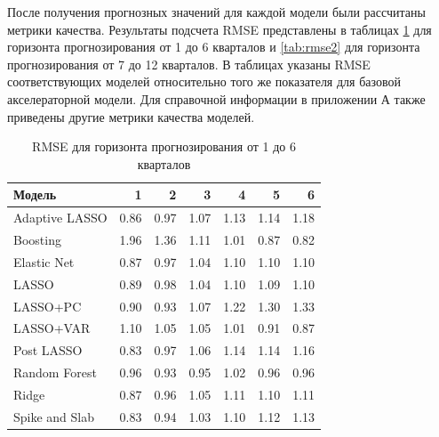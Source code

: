 После получения прогнозных значений для каждой модели были рассчитаны метрики качества. Результаты подсчета RMSE представлены в таблицах \ref{tab:rmse1} для горизонта прогнозирования от 1 до 6 кварталов и \ref{tab:rmse2} для горизонта прогнозирования от 7 до 12 кварталов. В таблицах указаны RMSE соответствующих моделей относительно того же показателя для базовой акселераторной модели. Для справочной информации в приложении А также приведены другие метрики качества моделей. 



\begin{table}[ht]
\centering
\caption{RMSE для горизонта прогнозирования от 1 до 6 кварталов}
\label{tab:rmse1}
\begin{tabular}{lrrrrrr}
  \hline
Модель & 1 & 2 & 3 & 4 & 5 & 6 \\ 
  \hline
Adaptive LASSO & 0.86 & 0.97 & 1.07 & 1.13 & 1.14 & 1.18 \\ 
  Boosting & 1.96 & 1.36 & 1.11 & 1.01 & 0.87 & 0.82 \\ 
  Elastic Net & 0.87 & 0.97 & 1.04 & 1.10 & 1.10 & 1.10 \\ 
  LASSO & 0.89 & 0.98 & 1.04 & 1.10 & 1.09 & 1.10 \\ 
  LASSO+PC & 0.90 & 0.93 & 1.07 & 1.22 & 1.30 & 1.33 \\ 
  LASSO+VAR & 1.10 & 1.05 & 1.05 & 1.01 & 0.91 & 0.87 \\ 
  Post LASSO & 0.83 & 0.97 & 1.06 & 1.14 & 1.14 & 1.16 \\ 
  Random Forest & 0.96 & 0.93 & 0.95 & 1.02 & 0.96 & 0.96 \\ 
  Ridge & 0.87 & 0.96 & 1.05 & 1.11 & 1.10 & 1.11 \\ 
  Spike and Slab & 0.83 & 0.94 & 1.03 & 1.10 & 1.12 & 1.13 \\ 
   \hline
\end{tabular}
\end{table}

